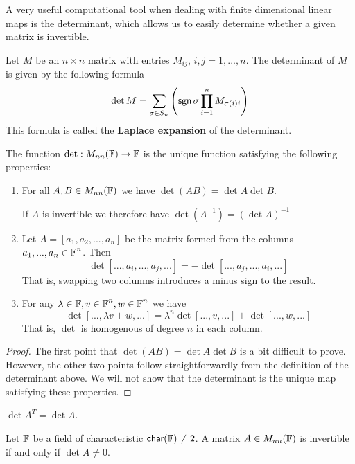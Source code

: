 A very useful computational tool when dealing with finite dimensional linear maps is the determinant, which allows us to easily determine whether a given matrix is invertible.
\begin{defn}[Determinant]
Let $M$ be an $n\times n$ matrix with entries $M_{ij}$, $i,j=1,...,n$. The determinant of $M$ is given by the following formula
\[\det M = \sum_{\sigma \in S_n} \left(\operatorname{\textsf{sgn}}\sigma \prod_{i=1}^n M_{\sigma(i)i}\right)\]
This formula is called the \textbf{Laplace expansion} of the determinant.
\end{defn}
\begin{thm}The function $\det : M_{nn}(\operatorname{\mathbb{F}}) \to \operatorname{\mathbb{F}}$ is the unique function satisfying the following properties:
\begin{enumerate}
\item {
For all $A,B\in M_{nn}(\operatorname{\mathbb{F}})$ we have $\det (AB) = \det A \det B$. 

If $A$ is invertible we therefore have $\det (A^{-1}) = (\det A)^{-1}$
}
\item {
Let $A = [a_1,a_2,...,a_n]$ be the matrix formed from the columns $a_1,...,a_n\in \operatorname{\mathbb{F}}^n$. Then 
\[\det [...,a_i,...,a_j,...] = - \det [...,a_j,...,a_i,...]\]
That is, swapping two columns introduces a minus sign to the result.
}
\item {
For any $\lambda \in \operatorname{\mathbb{F}}, v\in \operatorname{\mathbb{F}}^n, w\in \operatorname{\mathbb{F}}^n$ we have
\[\det [...,\lambda v + w,...] = \lambda^n \det [...,v,...] + \det [...,w,...]\]
That is, $\det$ is homogenous of degree $n$ in each column.
}
\end{enumerate}
\end{thm}
\begin{proof}
    The first point that $\det (AB) = \det A \det B$ is a bit difficult to prove. However, the other two points follow straightforwardly from the definition of the determinant above. We will not show that the determinant is the unique map satisfying these properties.
\end{proof}
\begin{thm}
    $\det A^T = \det A$.
\end{thm}
\begin{thm} Let $\operatorname{\mathbb{F}}$ be a field of characteristic $\textsf{char}(\operatorname{\mathbb{F}})\neq 2$. 
A matrix $A \in M_{nn}(\operatorname{\mathbb{F}})$ is invertible if and only if $\det A \neq 0$.
\end{thm}

